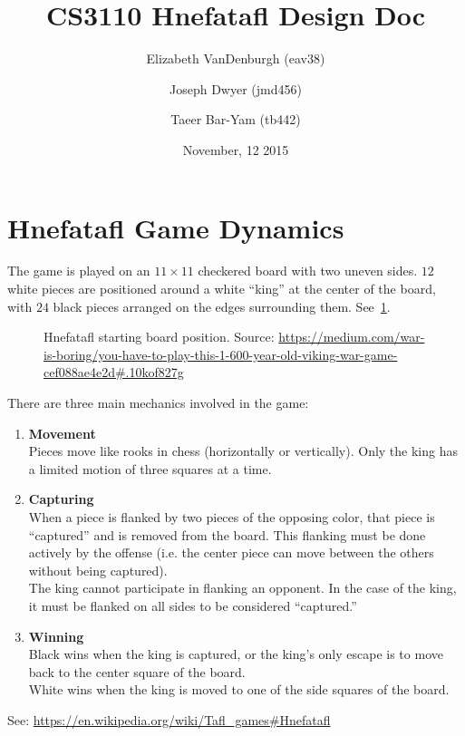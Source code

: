 \documentclass[11pt, oneside]{article}
\title{CS3110 Hnefatafl Design Doc}
\author{Elizabeth VanDenburgh (eav38)\and Joseph Dwyer (jmd456)\and Taeer Bar-Yam (tb442)}
\date{November, 12 2015}
\begin{document}
\maketitle

\section{Hnefatafl Game Dynamics}
The game is played on an $11\times 11$ checkered board with two uneven sides.
$12$ white pieces are positioned around a white ``king'' at the center of the
board, with $24$ black pieces arranged on the edges surrounding them.
See~\ref{fig:initial_position}.
\begin{figure}\label{fig:initial_position}
  \centering
  \caption{Hnefatafl starting board position. Source: \url{https://medium.com/war-is-boring/you-have-to-play-this-1-600-year-old-viking-war-game-cef088ae4e2d\#.10kof827g}}
\end{figure}
There are three main mechanics involved in the game:
\begin{enumerate}
\item \textbf{Movement}\\
  Pieces move like rooks in chess (horizontally or vertically).
  Only the king has a limited motion of three squares at a time.
\item \textbf{Capturing}\\
  When a piece is flanked by two pieces of the opposing color, that piece is
  ``captured'' and is removed from the board.  This flanking must be done
  actively by the offense (i.e. the center piece can move between the others
  without being captured).\\
  The king cannot participate in flanking an opponent. In the case of the king,
  it must be flanked on all sides to be considered ``captured.''
\item \textbf{Winning}\\
  Black wins when the king is captured, or the king's only escape is to move
  back to the center square of the board.\\
  White wins when the king is moved to one of the side squares of the board.
\end{enumerate}
See: \url{https://en.wikipedia.org/wiki/Tafl\_games\#Hnefatafl}
\end{document}
